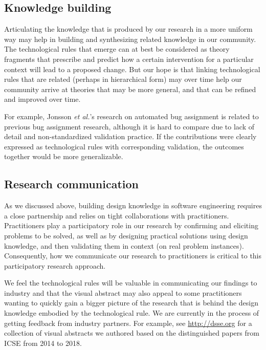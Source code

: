 \documentclass[graybox]{svmult}
\begin{document}
\subsection{Knowledge building}
\label{sec:knowledge}

Articulating the knowledge that is produced by our research in a more uniform way may help in building and synthesizing related knowledge in our community. 
The technological rules that emerge can at best be considered as theory fragments that prescribe and predict how a certain intervention for a particular context will lead to a proposed change. 
But our hope is that linking technological rules that are related (perhaps in hierarchical form) may over time help our community arrive at theories that may be more general, and that can be refined and improved over time. 

For example, Jonsson \emph{et al.}'s research on automated bug assignment is related to previous bug assignment research, although it is hard to compare due to lack of detail and non-standardized validation practice. If the contributions were clearly expressed as technological rules with corresponding validation, the outcomes together would be more generalizable. 

\subsection{Research communication}
\label{sec:communication}

As we discussed above, building design knowledge in software engineering requires a close partnership and relies on tight collaborations with practitioners. 
Practitioners play a participatory role in our research by confirming and eliciting problems to be solved, as well as by designing practical solutions using design knowledge, and then validating them in context (on real problem instances). 
Consequently, how we communicate our research to practitioners is critical to this participatory research approach. 

We feel the technological rules will be valuable in communicating our findings to industry and that the visual abstract may also appeal to some practitioners wanting to quickly gain a bigger picture of the research that is behind the design knowledge embodied by the technological rule. 
We are currently in the process of getting feedback from industry partners.  For example, see \url{http://dsse.org} for a collection of visual abstracts we authored based on the distinguished papers from ICSE from 2014 to 2018.  
\end{document}
